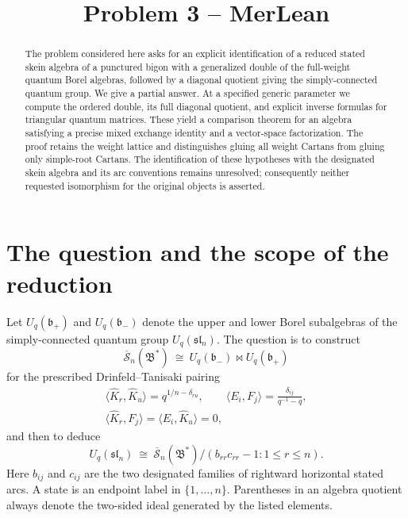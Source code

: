 \documentclass[11pt]{article}
\title{Problem 3 -- MerLean}
\author{}
\date{}
\theoremstyle{definition}
\theoremstyle{remark}
\newcommand{\cS}{\overline{\mathscr{S}}}
\begin{document}
\maketitle
\begin{abstract}
The problem considered here asks for an explicit identification of a reduced stated skein algebra of a punctured bigon with a generalized double of the full-weight quantum Borel algebras, followed by a diagonal quotient giving the simply-connected quantum group. We give a partial answer. At a specified generic parameter we compute the ordered double, its full diagonal quotient, and explicit inverse formulas for triangular quantum matrices. These yield a comparison theorem for an algebra satisfying a precise mixed exchange identity and a vector-space factorization. The proof retains the weight lattice and distinguishes gluing all weight Cartans from gluing only simple-root Cartans. The identification of these hypotheses with the designated skein algebra and its arc conventions remains unresolved; consequently neither requested isomorphism for the original objects is asserted.
\end{abstract}

\section{The question and the scope of the reduction}

Let $U_q(\mathfrak b_+)$ and $U_q(\mathfrak b_-)$ denote the upper and lower Borel subalgebras of the simply-connected quantum group $U_q(\mathfrak{sl}_n)$. The question is to construct
\begin{equation}\label{eq:question}
 \cS_n(\mathfrak B^*)\ \cong\ U_q(\mathfrak b_-)\bowtie U_q(\mathfrak b_+)
\end{equation}
for the prescribed Drinfeld--Tanisaki pairing
\begin{equation}\label{eq:requested-pairing}
 \begin{gathered}
 \langle\hat K_r,\hat K_u\rangle=q^{1/n-\delta_{ru}},\qquad
 \langle E_i,F_j\rangle=\frac{\delta_{ij}}{q^{-1}-q},\\
 \langle\hat K_r,F_j\rangle=\langle E_i,\hat K_u\rangle=0,
 \end{gathered}
\end{equation}
and then to deduce
\begin{equation}\label{eq:question-quotient}
 U_q(\mathfrak{sl}_n)\ \cong\ \cS_n(\mathfrak B^*)/
 (b_{rr}c_{rr}-1:1\leq r\leq n).
\end{equation}
Here $b_{ij}$ and $c_{ij}$ are the two designated families of rightward horizontal stated arcs. A state is an endpoint label in $\{1,\ldots,n\}$. Parentheses in an algebra quotient always denote the two-sided ideal generated by the listed elements.
\end{document}
